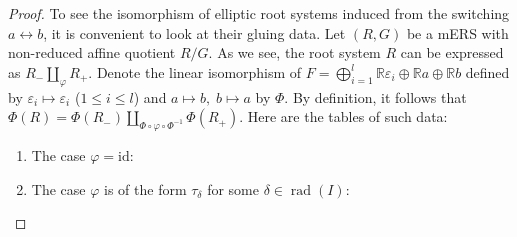 \documentclass[11pt]{amsart}
\newcommand{\R}{\mathbb{R}}
\newcommand{\id}{\mathrm{id}}
\newcommand{\rad}{\operatorname{rad}}
\newcommand{\vep}{\varepsilon}
\begin{document}
\begin{proof}


To see the isomorphism of elliptic root systems induced from the switching $a \leftrightarrow b$, it is convenient to look at their gluing data. 
Let $(R,G)$ be a mERS with non-reduced affine quotient $R/G$. As we see, the root system $R$ can be expressed as $R_- \amalg_\varphi R_+$. Denote the linear isomorphism of $F=\bigoplus_{i=1}^l \R \vep_i \oplus \R a \oplus \R b$ defined by $\vep_i \mapsto \vep_i$ ($1\leq i\leq l$) and $a \mapsto b, \; b \mapsto a$ by $\Phi$. By definition, it follows that $\Phi(R)=\Phi(R_-) \amalg_{\Phi \circ \varphi \circ \Phi^{-1}} \Phi(R_+)$. Here are the tables of such data: 
\begin{enumerate}
\item The case $\varphi=\id$:

\begin{center}
\end{center}
\vskip 0.2in

\item The case $\varphi$ is of the form $\tau_\delta$ for some $\delta \in \rad(I)$:

\begin{center}


\end{center}
\end{enumerate}
\end{proof}
\end{document}
